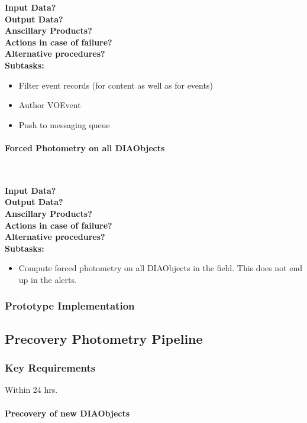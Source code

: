 \noindent
{\bf Input Data?}\\
{\bf Output Data?}\\
{\bf Anscillary Products?}\\
{\bf Actions in case of failure?}\\
{\bf Alternative procedures?}\\

\noindent
{\bf Subtasks:}
\begin{itemize}
\item Filter event records (for content as well as for events)
\item Author VOEvent
\item Push to messaging queue
\end{itemize}

\paragraph{Forced Photometry on all DIAObjects}~

\noindent
{\bf Input Data?}\\
{\bf Output Data?}\\
{\bf Anscillary Products?}\\
{\bf Actions in case of failure?}\\
{\bf Alternative procedures?}\\

\noindent
{\bf Subtasks:}
\begin{itemize}
\item Compute forced photometry on all DIAObjects in the field.  This does not end up in the alerts.
\end{itemize}

\subsubsection{Prototype Implementation}

\clearpage

\subsection{Precovery Photometry Pipeline}

\subsubsection{Key Requirements}

Within 24 hrs.

\paragraph{Precovery of new DIAObjects}~

